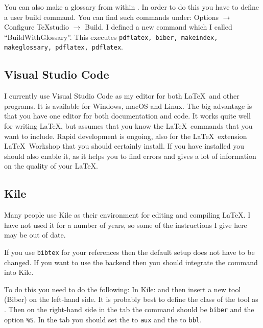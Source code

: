 You can also make a glossary from within \TeXstudio. In order to do
this you have to define a user build command. You can find such commands
under:  \textsf{Options} $\to$ \textsf{Configure TeXstudio} $\to$
\textsf{Build}. I defined a new command which I called
\enquote{BuildWithGlossary}. This executes \texttt{pdflatex, biber,
  makeindex, makeglossary, pdflatex, pdflatex}.


\subsection{Visual Studio Code}%
\label{sec:app:vscode}%

I currently use Visual Studio Code as my editor for both
\LaTeX\ and other programs.
It is available for Windows, macOS and Linux.
The big advantage is that you have one editor for both documentation and code.
It works quite well for writing \LaTeX,
but assumes that you know the \LaTeX\ commands that you want to include.
Rapid development is ongoing,
also for the \LaTeX\ extension \textsf{\LaTeX\ Workshop} that you should certainly install.
If you have  installed you should also enable it,
as it helps you to find errors 
and gives a lot of information on the quality of your \LaTeX.


\subsection{Kile}%
\label{sec:app:kubuntu:kile}

Many people use Kile as their environment for editing and compiling \LaTeX. 
I have not used it for a number of years,
so some of the instructions I give here may be out of date.

If you use \texttt{bibtex} for your references then the default
setup does not have to be changed. If you want to use the
 backend then you should integrate the
command into Kile.

To do this you need to do the following:
In Kile:  and
then insert a new tool (Biber) on the left-hand side. It is probably
best to define the class of the tool as \BibTeX. Then on the
right-hand side in the  tab the command should be
\texttt{biber} and the option \texttt{\%S}. In the 
tab you should set the  to \texttt{aux} and
the  to \texttt{bbl}.


